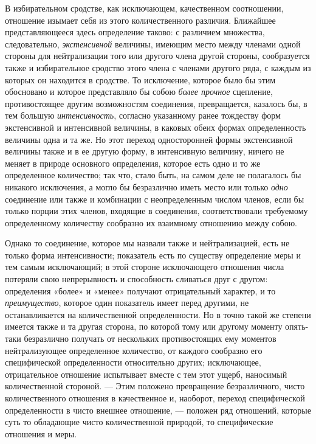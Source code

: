 В избирательном сродстве, как исключающем, качественном соотношении,
отношение изымает себя из этого количественного различия. Ближайшее
представляющееся здесь определение таково: с различием множества,
следовательно, {\em экстенсивной} величины, имеющим
место между членами одной стороны для нейтрализации того или другого члена
другой стороны, сообразуется также и избирательное сродство этого члена с
членами другого ряда, с каждым из которых он находится в сродстве. То
исключение, которое было бы этим обосновано и которое представляло бы собою
{\em более прочное} сцепление, противостоящее другим
возможностям соединения, превращается, казалось бы, в тем большую
{\em интенсивность}, согласно указанному ранее
тождеству форм экстенсивной и интенсивной величины, в каковых обеих формах
определенность величины одна и та же. Но этот переход односторонней формы
экстенсивной величины также и в ее другую форму, в интенсивную величину,
ничего не меняет в природе основного определения, которое есть одно и то же
определенное количество; так что, стало быть, на самом деле не полагалось
бы никакого исключения, а могло бы безразлично иметь место или только
{\em одно} соединение или также и комбинации с
неопределенным числом членов, если бы только порции этих членов, входящие в
соединения, соответствовали требуемому определенному количеству сообразно
их взаимному отношению между собою.

Однако то соединение, которое мы назвали также и нейтрализацией, есть не
только форма интенсивности; показатель есть по существу определение меры и
тем самым исключающий; в этой стороне исключающего отношения числа потеряли
свою непрерывность и способность сливаться друг с другом: определения
«более» и «менее» получают отрицательный характер, и то
{\em преимущество}, которое один показатель имеет перед
другими, не останавливается на количественной определенности. Но в точно
такой же степени имеется также и та другая сторона, по которой тому или
другому моменту опять-таки безразлично получать от нескольких
противостоящих ему моментов нейтрализующее определенное количество, от
каждого сообразно его специфической определенности относительно других;
исключающее, отрицательное отношение испытывает вместе с тем этот ущерб,
наносимый количественной стороной. — Этим положено превращение
безразличного, чисто количественного отношения в качественное и, наоборот,
переход специфической определенности в чисто внешнее отношение, — положен
ряд отношений, которые суть то обладающие чисто количественной природой, то
специфические отношения и меры.

